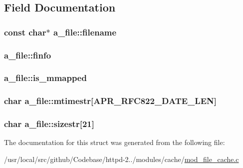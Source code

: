 \subsection{Field Documentation}
\subsubsection[{\texorpdfstring{filename}{filename}}]{\setlength{\rightskip}{0pt plus 5cm}const char$\ast$ a\+\_\+file\+::filename}\hypertarget{structa__file_a33b9ded780749ce4892e770453236881}{}\label{structa__file_a33b9ded780749ce4892e770453236881}
\subsubsection[{\texorpdfstring{finfo}{finfo}}]{ a\+\_\+file\+::finfo}\hypertarget{structa__file_a065cb41ca77467d8fd72acefe0f8644c}{}\label{structa__file_a065cb41ca77467d8fd72acefe0f8644c}
\subsubsection[{\texorpdfstring{is\+\_\+mmapped}{is_mmapped}}]{ a\+\_\+file\+::is\+\_\+mmapped}\hypertarget{structa__file_a3af8626a72019fd067b1338942374c66}{}\label{structa__file_a3af8626a72019fd067b1338942374c66}
\subsubsection[{\texorpdfstring{mtimestr}{mtimestr}}]{\setlength{\rightskip}{0pt plus 5cm}char a\+\_\+file\+::mtimestr\mbox{[}{\bf A\+P\+R\+\_\+\+R\+F\+C822\+\_\+\+D\+A\+T\+E\+\_\+\+L\+EN}\mbox{]}}\hypertarget{structa__file_a4102a1f940d4871032950fc21c7b495f}{}\label{structa__file_a4102a1f940d4871032950fc21c7b495f}
\subsubsection[{\texorpdfstring{sizestr}{sizestr}}]{\setlength{\rightskip}{0pt plus 5cm}char a\+\_\+file\+::sizestr\mbox{[}21\mbox{]}}\hypertarget{structa__file_a12a49e8c0f81f545d2e648294409e62e}{}\label{structa__file_a12a49e8c0f81f545d2e648294409e62e}


The documentation for this struct was generated from the following file\+:\begin{DoxyCompactItemize}
\item 
/usr/local/src/github/\+Codebase/httpd-\/2../modules/cache/\hyperlink{mod__file__cache_8c}{mod\+\_\+file\+\_\+cache.\+c}\end{DoxyCompactItemize}
